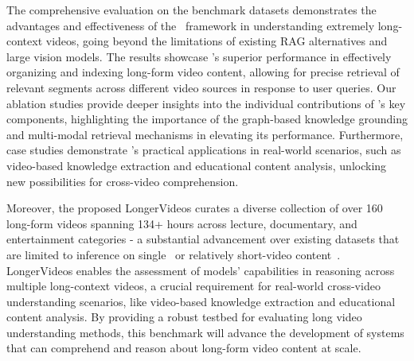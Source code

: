 The comprehensive evaluation on the benchmark datasets demonstrates the advantages and effectiveness of the \model\ framework in understanding extremely long-context videos, going beyond the limitations of existing RAG alternatives and large vision models. The results showcase \model's superior performance in effectively organizing and indexing long-form video content, allowing for precise retrieval of relevant segments across different video sources in response to user queries. Our ablation studies provide deeper insights into the individual contributions of \model's key components, highlighting the importance of the graph-based knowledge grounding and multi-modal retrieval mechanisms in elevating its performance. Furthermore, case studies demonstrate \model's practical applications in real-world scenarios, such as video-based knowledge extraction and educational content analysis, unlocking new possibilities for cross-video comprehension.

Moreover, the proposed LongerVideos curates a diverse collection of over 160 long-form videos spanning 134+ hours across lecture, documentary, and entertainment categories - a substantial advancement over existing datasets that are limited to inference on single~\cite{MLVU, LVBench} or relatively short-video content~\cite{Video-MME, EgoSchema}. LongerVideos enables the assessment of models' capabilities in reasoning across multiple long-context videos, a crucial requirement for real-world cross-video understanding scenarios, like video-based knowledge extraction and educational content analysis. By providing a robust testbed for evaluating long video understanding methods, this benchmark will advance the development of systems that can comprehend and reason about long-form video content at scale.